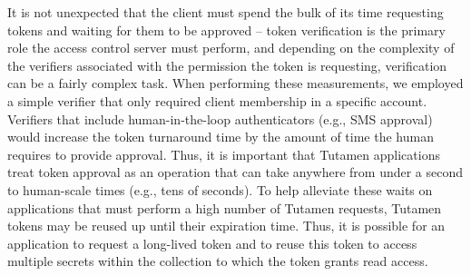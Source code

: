 It is not unexpected that the client must spend the bulk of its time
requesting tokens and waiting for them to be approved -- token
verification is the primary role the access control server must
perform, and depending on the complexity of the verifiers associated
with the permission the token is requesting, verification can be a
fairly complex task. When performing these measurements, we employed a
simple verifier that only required client membership in a specific
account. Verifiers that include human-in-the-loop authenticators
(e.g., SMS approval) would increase the token turnaround time by the
amount of time the human requires to provide approval. Thus, it is
important that Tutamen applications treat token approval as an
operation that can take anywhere from under a second to human-scale
times (e.g., tens of seconds). To help alleviate these waits on
applications that must perform a high number of Tutamen requests,
Tutamen tokens may be reused up until their expiration time. Thus, it
is possible for an application to request a long-lived token and to
reuse this token to access multiple secrets within the collection to
which the token grants read access.
 
